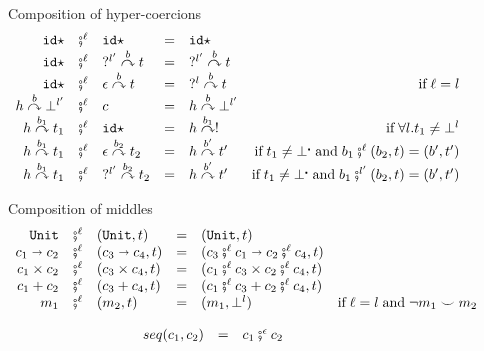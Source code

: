 \documentclass[acmsmall,review,anonymous]{acmart}\settopmatter{printfolios=true,printccs=false,printacmref=false}
\newcommand{\funrule}[3]{#1 &=& #2 & #3\\}
\newcommand{\comprule}[4]{#1 & \fatsemi^\ell & #2 & = & #3 & #4 \\}
\newcommand{\plus}[0]{+}
\newcommand{\hyperCoercionI}[0]{\mathtt{id\star}}
\newcommand{\hyperCoercionC}[3]{#1 \overset{#2}{\curvearrowright} #3}
\newcommand{\POOunit}[0]{\mathtt{Unit}}
\newcommand{\POOfun}[2]{#1 \shortrightarrow #2}
\newcommand{\POOprod}[2]{#1 \times #2}
\newcommand{\POOsum}[2]{#1 \plus #2}
\newcommand{\sidecond}[1]{\text{if}\;#1}
\begin{document}
\begin{figure}
	Composition of hyper-coercions 
	\[ 
	\begin{array}{rclclr}
	
	\comprule{
		\hyperCoercionI
	}{
		\hyperCoercionI
	}{
		\hyperCoercionI
	}{}
	
	\comprule{
		\hyperCoercionI
	}{
		\hyperCoercionC{?^{l'}}{b}{t}
	}{
		\hyperCoercionC{?^{l'}}{b}{t}
	}{}
	
	\comprule{
		\hyperCoercionI
	}{
		\hyperCoercionC{\epsilon}{b}{t}
	}{
		\hyperCoercionC{?^{l}}{b}{t}
	}{\sidecond{\ell = l}}
	
	\comprule{
		\hyperCoercionC{h}{b}{\bot^{l'}}
	}{
		c
	}{
		\hyperCoercionC{h}{b}{\bot^{l'}}
	}{}
	
	\comprule{
		\hyperCoercionC{h}{b_1}{t_1}
	}{
		\hyperCoercionI
	}{
		\hyperCoercionC{h}{b_1}{!}
	}{
		\sidecond{\forall l. t_1 \neq \bot^{l}}
	}
	
	\comprule{
		\hyperCoercionC{h}{b_1}{t_1}
	}{
		\hyperCoercionC{\epsilon}{b_2}{t_2}
	}{
		\hyperCoercionC{h}{b'}{t'}
	}{
		\sidecond{
			t_1 \neq \bot^{\centerdot} \; \text{and} \;
			b_1 \fatsemi^{\ell} (b_2, t) = (b', t')
		}
	}
	
	\comprule{
		\hyperCoercionC{h}{b_1}{t_1}
	}{
		\hyperCoercionC{?^{l'}}{b_2}{t_2}
	}{
		\hyperCoercionC{h}{b'}{t'}
	}{
		\sidecond{
		t_1 \neq \bot^{\centerdot} \; \text{and} \;
		b_1 \fatsemi^{l'} (b_2, t) = (b', t')
		}
	}
	\end{array}
	\]
	
	Composition of middles 
	\[ 
	\begin{array}{rclclr}
	\comprule{\POOunit}{(\POOunit,t)}{
		(\POOunit,t)
	}{}
	\comprule{\POOfun{c_1}{c_2}}{(\POOfun{c_3}{c_4},t)}{
		(\POOfun{c_3 \fatsemi^{\ell} c_1}{c_2 \fatsemi^\ell c_4},t)
	}{}
	\comprule{\POOprod{c_1}{c_2}}{(\POOprod{c_3}{c_4},t)}{
		(\POOprod{c_1 \fatsemi^\ell c_3}{c_2 \fatsemi^\ell c_4},t)
	}{}
	\comprule{\POOsum{c_1}{c_2}}{(\POOsum{c_3}{c_4},t)}{
		(\POOsum{c_1 \fatsemi^\ell c_3}{c_2 \fatsemi^\ell c_4},t)
	}{}
	\comprule{m_1}{(m_2,t)}{
		(m_1,\bot^l)
	}{
		\sidecond{
		\ell = l \; \text{and} \;
		\neg m_1 \smile m_2 
		}
	}
	\end{array}
	\]
	
	\[
	\begin{array}{rclr}
	\funrule{seq(c_1,c_2)}{
		c_1 \fatsemi^\epsilon c_2
	}{}
	\end{array}
	\]
	

\end{figure}
\end{document}
